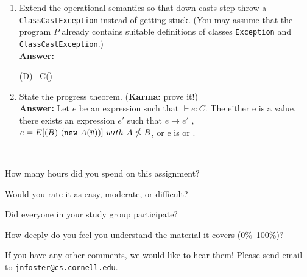 \documentclass[10pt]{article}
\begin{document}
\begin{exercise}
\begin{enumerate}
\item Extend the operational semantics so that down casts step throw a
\texttt{ClassCastException} instead of getting stuck. (You may assume
that the program $P$ already contains suitable definitions of classes
\texttt{Exception} and \texttt{ClassCastException}.)\\
\noindent \textbf{Answer:} \\
\begin{center}
{ (D) ~C() \rightarrow {}}
{ }
\end{center}

\item State the progress theorem. (\textbf{Karma:} prove it!)\\[0.3cm]
\noindent \textbf{Answer:} Let $e$ be an expression such that $\vdash e: C.$ The either e is a value, there exists an expression $e'$ such that $e \rightarrow e'$ , $e = E[(B) \ (\kw{new}~A(\ol{v}))] \ with \ A \nleq B$, or e is  or .


\end{enumerate}
\end{exercise}

\begin{debriefing} \hfill\\[-4ex]
\begin{enumerate*}
\item How many hours did you spend on this assignment? 
\item Would you rate it as easy, moderate, or difficult? 
\item Did everyone in your study group participate? 
\item How deeply do you feel you understand the material it covers (0\%--100\%)? 
\item If you have any other comments, we would like to hear them!
  Please send email to \texttt{jnfoster@cs.cornell.edu}.
\end{enumerate*}
\end{debriefing}
\end{document}
